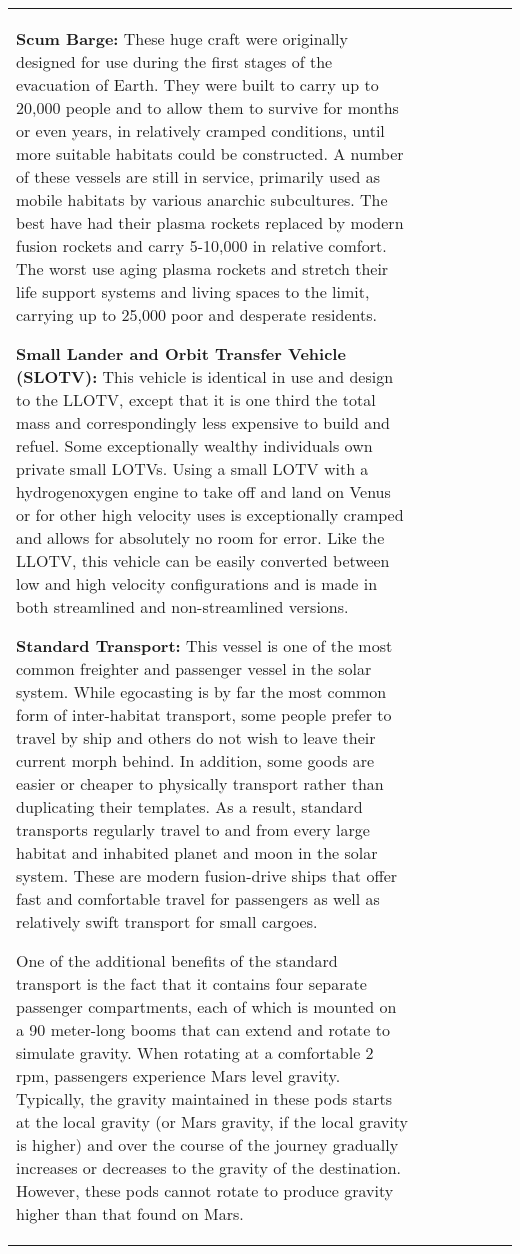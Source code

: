 \begin{tabular}{|l|l|l|l|l|l|l|}
\textbf{Scum Barge:} These huge craft were originally designed for use during the first stages of the evacuation of Earth. They were built to carry up to 20,000 people and to allow them to survive for months or even years, in relatively cramped conditions, until more suitable habitats could be constructed. A number of these vessels are still in service, primarily used as mobile habitats by various anarchic subcultures. The best have had their plasma rockets replaced by modern fusion rockets and carry 5-10,000 in relative comfort. The worst use aging plasma rockets and stretch their life support systems and living spaces to the limit, carrying up to 25,000 poor and desperate residents. 

\textbf{Small Lander and Orbit Transfer Vehicle (SLOTV):} This vehicle is identical in use and design to the LLOTV, except that it is one third the total mass and correspondingly less expensive to build and refuel. Some exceptionally wealthy individuals own private small LOTVs. Using a small LOTV with a hydrogenoxygen engine to take off and land on Venus or for other high velocity uses is exceptionally cramped and allows for absolutely no room for error. Like the LLOTV, this vehicle can be easily converted between low and high velocity configurations and is made in both streamlined and non-streamlined versions. 

\textbf{Standard Transport:} This vessel is one of the most common freighter and passenger vessel in the solar system. While egocasting is by far the most common form of inter-habitat transport, some people prefer to travel by ship and others do not wish to leave their current morph behind. In addition, some goods are easier or cheaper to physically transport rather than duplicating their templates. As a result, standard transports regularly travel to and from every large habitat and inhabited planet and moon in the solar system. These are modern fusion-drive ships that offer fast and comfortable travel for passengers as well as relatively swift transport for small cargoes. 

One of the additional benefits of the standard transport is the fact that it contains four separate passenger compartments, each of which is mounted on a 90 meter-long booms that can extend and rotate to simulate gravity. When rotating at a comfortable 2 rpm, passengers experience Mars level gravity. Typically, the gravity maintained in these pods starts at the local gravity (or Mars gravity, if the local gravity is higher) and over the course of the journey gradually increases or decreases to the gravity of the destination. However, these pods cannot rotate to produce gravity higher than that found on Mars. 


\end{tabular}
